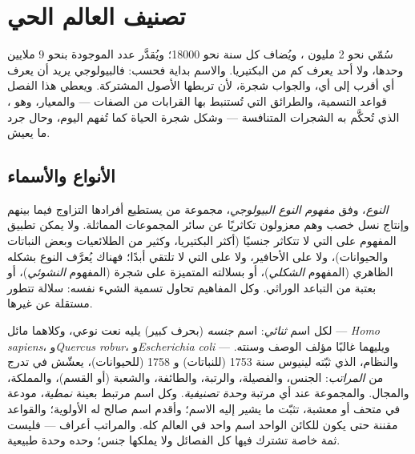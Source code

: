 \chapter{تصنيف العالم الحي}\label{ch:b1:classifying-biodiversity}

سُمّي نحو \num{2} مليون ، ويُضاف كل سنة نحو
\num{18000}؛ ويُقدَّر عدد  الموجودة بنحو
\num{9} ملايين  وحدها، ولا أحد يعرف كم من
البكتيريا. والاسم بداية فحسب: فالبيولوجي يريد أن يعرف
أي  أقرب إلى أي، والجواب شجرة، لأن
 تربطها الأصول المشتركة. ويعطي هذا الفصل قواعد
التسمية، والطرائق التي تُستنبط بها القرابات من
الصفات --- والمعيار، وهو ، الذي تُحكَّم به الشجرات
المتنافسة --- وشكل شجرة الحياة كما تُفهم اليوم،
وحال جرد ما يعيش.

\section{الأنواع والأسماء}

\begin{definition}[النوع]\label{def:b1:classifying-biodiversity:species}
\emph{النوع}، وفق \emph{مفهوم النوع البيولوجي}، مجموعة من
 يستطيع أفرادها التزاوج فيما بينهم وإنتاج نسل خصب
وهم معزولون تكاثريًا عن سائر المجموعات المماثلة.
ولا يمكن تطبيق المفهوم على  التي لا تتكاثر
جنسيًا (أكثر البكتيريا، وكثير من الطلائعيات وبعض النباتات والحيوانات)،
ولا على الأحافير، ولا على  التي لا تلتقي أبدًا؛ فهناك يُعرَّف النوع
بشكله الظاهري (المفهوم \emph{الشكلي})، أو بسلالته المتميزة على شجرة (المفهوم
\emph{النشوئي})، أو بعتبة من التباعد الوراثي. وكل المفاهيم تحاول تسمية
الشيء نفسه: سلالة تتطور مستقلة عن غيرها.
\end{definition}

\begin{definition}\label{def:b1:classifying-biodiversity:nomenclature}
لكل  اسم \emph{ثنائي}: اسم
\emph{جنسه} (بحرف كبير) يليه نعت نوعي، وكلاهما
مائل --- \emph{Homo sapiens}، و\emph{Quercus robur}،
و\emph{Escherichia coli} --- ويليهما غالبًا مؤلف الوصف وسنته.
والنظام، الذي ثبّته لينيوس سنة 1753 (للنباتات) و
1758 (للحيوانات)، يعشّش  في تدرج من \emph{المراتب}: الجنس،
والفصيلة، والرتبة، والطائفة، والشعبة (أو القسم)، والمملكة، والمجال. والمجموعة
عند أي مرتبة \emph{وحدة تصنيفية}. وكل اسم مرتبط بعينة \emph{نمطية}، مودعة في متحف أو معشبة، تثبّت ما يشير إليه
الاسم؛ وأقدم اسم صالح له الأولوية؛ والقواعد
مقننة حتى يكون للكائن الواحد اسم واحد في العالم كله. والمراتب
أعراف --- فليست ثمة خاصة تشترك فيها كل الفصائل ولا يملكها
جنس؛  وحده وحدة طبيعية.
\end{definition}

